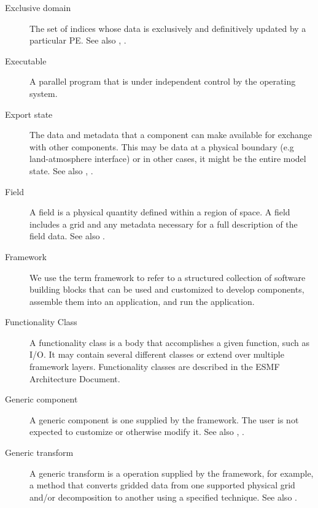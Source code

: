 \begin{description}
\item[Exclusive domain] \label{glos:ExcDomain} The set of indices whose 
  data is exclusively and definitively updated by a particular PE. 
  See also , 
  .

\item[Executable] \label{glos:Exec} 
  A parallel program that is under independent control by the operating 
  system.

\item[Export state] \label{glos:ExportState} The data and metadata that 
  a component can make available for exchange with other components. 
  This may be data at a physical boundary (e.g land-atmosphere interface) 
  or in other cases, it might be the entire model state.  
  See also , 
  .

\item[Field] \label{glos:Field} A field is a physical quantity
  defined within a region of space.  A field includes a grid 
  and any metadata necessary for a full description of the field data.
  See also .

\item[Framework] \label{glos:Framework} We use the term framework to 
  refer to a structured collection of software building blocks that can be used 
  and customized to develop components, assemble them into an application, and 
  run the application.

\item[Functionality Class] \label{glos:FuncClass}
  A functionality class is a body that accomplishes a given function, such
  as I/O. It may contain several different classes or extend over multiple
  framework layers. Functionality classes are described in the ESMF Architecture
  Document.

\item[Generic component] \label{glos:GenericComp} A generic component
  is one supplied by the framework.  The user is not expected to 
  customize or otherwise modify it.  See also , 
  . 

\item[Generic transform] \label{glos:GenericTrans} A generic transform 
  is a operation supplied by the framework, for example, a method 
  that converts gridded data from one supported physical grid and/or 
  decomposition to another using a specified technique.  See also .


\end{description}
